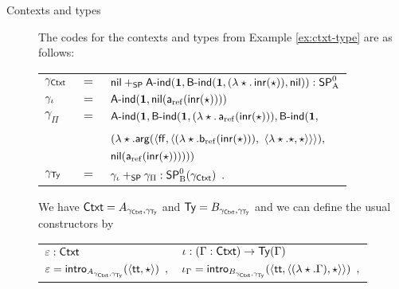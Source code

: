 \documentclass{schwicht}
\begin{document}
\begin{description}







\item[Contexts and types]

The codes for the contexts and types from Example \ref{ex:ctxt-type} are as follows: \vskip
0.2cm
\begin{tabular}{lcl}
$\gamma_{\mathsf{Ctxt}}$ &$=$& $\mathsf{nil} +_{\mathsf{SP}} \mathsf{A}\text{-}\mathsf{ind}(\mathbf{1}, \mathsf{B}\text{-}\mathsf{ind}(\mathbf{1}, (\lambda \star .\,\mathsf{inr}(\star)),
\mathsf{nil})) : \mathsf{SP}^{0}_{\mathrm{A}}$ \\
$\gamma_{\iota}$ &$=$& $\mathsf{A}\text{-}\mathsf{ind}(\mathbf{1}, \mathsf{nil}(\mathsf{a}_{\mathrm{ref}}(\mathsf{inr}(\star))))$ \\
$\gamma_{\Pi}$ &$=$& $\mathsf{A}\text{-}\mathsf{ind}(\mathbf{1}, \mathsf{B}\text{-}\mathsf{ind}(\mathbf{1}, (\lambda \star.\,\mathsf{a}_{\mathrm{ref}}(\mathsf{inr}(\star))),\mathsf{B}\text{-}\mathsf{ind}(\mathbf{1},$ \\
&& \qquad\quad $(\lambda \star.\mathsf{arg}(\langle \mathsf{ff}, \langle (\lambda
\star.\mathsf{b}_{\mathrm{ref}}(\mathsf{inr}(\star))),$ 
 $\langle \lambda \star.\star, \star\rangle\rangle\rangle),$ \\
&& \qquad\qquad $\mathsf{nil}(\mathsf{a}_{\mathrm{ref}}(\mathsf{inr}(\star))))))$ \\
$\gamma_{\mathsf{Ty}}$ &$=$& $\gamma_{\iota} +_{\mathsf{SP}} \gamma_{\Pi} : \mathsf{SP}^{0}_{\mathrm{B}}(\gamma_{\mathsf{Ctxt}})\enspace .$
\end{tabular}
\vskip 0.2cm \noindent
We have $\mathsf{Ctxt} = A_{\gamma_{\mathsf{Ctxt}}, \gamma_{\mathsf{Ty}}}$ and $\mathsf{Ty} =
B_{\gamma_{\mathsf{Ctxt}}, \gamma_{\mathsf{Ty}}}$
and we can define the usual constructors by
\vskip 0.2cm
\begin{tabular}{l@{\qquad}l}
  $\varepsilon : \mathsf{Ctxt}$ & $\iota : (\Gamma : \mathsf{Ctxt}) \to \mathsf{Ty}(\Gamma)$ \\
  $\varepsilon = \mathsf{intro}_{A_{\gamma_{\mathsf{Ctxt}}, \gamma_{\mathsf{Ty}}}}(\langle \mathsf{tt}, \star\rangle)\enspace ,$ & $\iota_{\Gamma} = \mathsf{intro}_{B_{\gamma_{\mathsf{Ctxt}}, \gamma_{\mathsf{Ty}}}}(\langle \mathsf{tt}, \langle (\lambda \star.\Gamma), \star\rangle\rangle)\enspace ,$\\
\end{tabular}
\vskip 0.2cm
\begin{tabular}{l}

\end{tabular}
\end{description}
\end{document}

